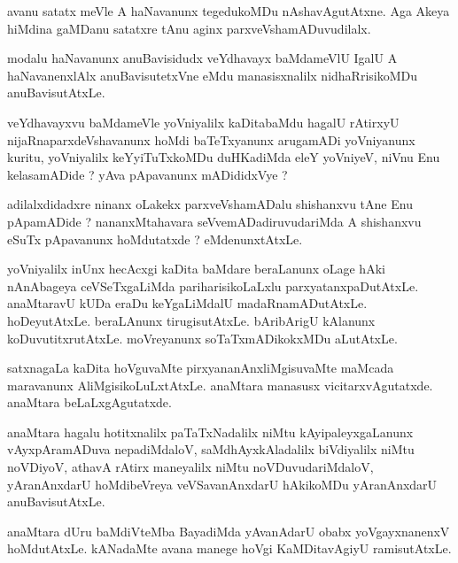 \documentclass{article}
\begin{document}
\begin{mn}
avanu  satatx meVle  A  haNavanunx  tegedukoMDu  nAshavAgutAtxne.  Aga  Akeya  hiMdina  gaMDanu  satatxre  tAnu  
aginx parxveVshamADuvudilalx.
\end{mn}

\begin{mn}
modalu  haNavanunx  anuBavisidudx  veYdhavayx  baMdameVlU  IgalU  A  haNavanenxlAlx  anuBavisutetxVne  eMdu  
manasisxnalilx  nidhaRrisikoMDu  anuBavisutAtxLe.
\end{mn}

\begin{mn}
veYdhavayxvu  baMdameVle  yoVniyalilx  kaDitabaMdu  hagalU  rAtirxyU  nijaRnaparxdeVshavanunx  hoMdi  baTeTxyanunx  
arugamADi  yoVniyanunx  kuritu,  yoVniyalilx  keYyiTuTxkoMDu  duHKadiMda  eleY  yoVniyeV,  niVnu  Enu  kelasamADide ?  
yAva  pApavanunx  mADididxVye ?
\end{mn}

\begin{mn}
adilalxdidadxre  ninanx  oLakekx  parxveVshamADalu  shishanxvu  tAne  Enu  pApamADide ?  nananxMtahavara  
seVvemADadiruvudariMda  A  shishanxvu  eSuTx  pApavanunx  hoMdutatxde ?  eMdenunxtAtxLe.
\end{mn}

\begin{mn}
yoVniyalilx  inUnx  hecAcxgi  kaDita baMdare  beraLanunx  oLage  hAki  nAnAbageya  ceVSeTxgaLiMda  pariharisikoLaLxlu  
parxyatanxpaDutAtxLe.  anaMtaravU  kUDa  eraDu  keYgaLiMdalU  madaRnamADutAtxLe.  hoDeyutAtxLe.  beraLAnunx  
tirugisutAtxLe.  bAribArigU  kAlanunx  koDuvutitxrutAtxLe.  moVreyanunx  soTaTxmADikokxMDu  aLutAtxLe.
\end{mn}

\begin{mn}
satxnagaLa  kaDita  hoVguvaMte  pirxyananAnxliMgisuvaMte  maMcada  maravanunx  AliMgisikoLuLxtAtxLe.  anaMtara  
manasusx  vicitarxvAgutatxde.  anaMtara  beLaLxgAgutatxde.
\end{mn}

\begin{mn}
anaMtara  hagalu  hotitxnalilx  paTaTxNadalilx  niMtu  kAyipaleyxgaLanunx  vAyxpAramADuva  nepadiMdaloV,  
saMdhAyxkAladalilx  biVdiyalilx  niMtu  noVDiyoV,  athavA  rAtirx  maneyalilx  niMtu  noVDuvudariMdaloV,  
yAranAnxdarU  hoMdibeVreya  veVSavanAnxdarU  hAkikoMDu  yAranAnxdarU  anuBavisutAtxLe.
\end{mn}

\begin{mn}
anaMtara  dUru  baMdiVteMba  BayadiMda  yAvanAdarU  obabx yoVgayxnanenxV  hoMdutAtxLe.  kANadaMte  avana  
manege  hoVgi  KaMDitavAgiyU  ramisutAtxLe.
\end{mn}
\end{document}
